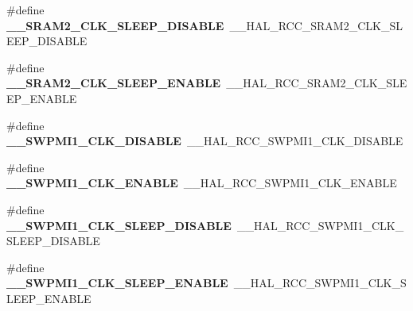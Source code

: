 \begin{DoxyCompactItemize}
\item 
\hypertarget{group___h_a_l___r_c_c___aliased_ga1459281323d5a30163aa6ef88e4dc18e}{\#define {\bfseries \-\_\-\-\_\-\-S\-R\-A\-M2\-\_\-\-C\-L\-K\-\_\-\-S\-L\-E\-E\-P\-\_\-\-D\-I\-S\-A\-B\-L\-E}~\-\_\-\-\_\-\-H\-A\-L\-\_\-\-R\-C\-C\-\_\-\-S\-R\-A\-M2\-\_\-\-C\-L\-K\-\_\-\-S\-L\-E\-E\-P\-\_\-\-D\-I\-S\-A\-B\-L\-E}\label{group___h_a_l___r_c_c___aliased_ga1459281323d5a30163aa6ef88e4dc18e}

\item 
\hypertarget{group___h_a_l___r_c_c___aliased_ga10a4a62a0e9b308c8b7fdd45951efc71}{\#define {\bfseries \-\_\-\-\_\-\-S\-R\-A\-M2\-\_\-\-C\-L\-K\-\_\-\-S\-L\-E\-E\-P\-\_\-\-E\-N\-A\-B\-L\-E}~\-\_\-\-\_\-\-H\-A\-L\-\_\-\-R\-C\-C\-\_\-\-S\-R\-A\-M2\-\_\-\-C\-L\-K\-\_\-\-S\-L\-E\-E\-P\-\_\-\-E\-N\-A\-B\-L\-E}\label{group___h_a_l___r_c_c___aliased_ga10a4a62a0e9b308c8b7fdd45951efc71}

\item 
\hypertarget{group___h_a_l___r_c_c___aliased_gada7c5432ad22e6214be6c30fdbac9638}{\#define {\bfseries \-\_\-\-\_\-\-S\-W\-P\-M\-I1\-\_\-\-C\-L\-K\-\_\-\-D\-I\-S\-A\-B\-L\-E}~\-\_\-\-\_\-\-H\-A\-L\-\_\-\-R\-C\-C\-\_\-\-S\-W\-P\-M\-I1\-\_\-\-C\-L\-K\-\_\-\-D\-I\-S\-A\-B\-L\-E}\label{group___h_a_l___r_c_c___aliased_gada7c5432ad22e6214be6c30fdbac9638}

\item 
\hypertarget{group___h_a_l___r_c_c___aliased_ga6ebd99e0c438717ba9d0f4c33dfee5c7}{\#define {\bfseries \-\_\-\-\_\-\-S\-W\-P\-M\-I1\-\_\-\-C\-L\-K\-\_\-\-E\-N\-A\-B\-L\-E}~\-\_\-\-\_\-\-H\-A\-L\-\_\-\-R\-C\-C\-\_\-\-S\-W\-P\-M\-I1\-\_\-\-C\-L\-K\-\_\-\-E\-N\-A\-B\-L\-E}\label{group___h_a_l___r_c_c___aliased_ga6ebd99e0c438717ba9d0f4c33dfee5c7}

\item 
\hypertarget{group___h_a_l___r_c_c___aliased_gae4421172c1cea5e53893e6f3f41729bf}{\#define {\bfseries \-\_\-\-\_\-\-S\-W\-P\-M\-I1\-\_\-\-C\-L\-K\-\_\-\-S\-L\-E\-E\-P\-\_\-\-D\-I\-S\-A\-B\-L\-E}~\-\_\-\-\_\-\-H\-A\-L\-\_\-\-R\-C\-C\-\_\-\-S\-W\-P\-M\-I1\-\_\-\-C\-L\-K\-\_\-\-S\-L\-E\-E\-P\-\_\-\-D\-I\-S\-A\-B\-L\-E}\label{group___h_a_l___r_c_c___aliased_gae4421172c1cea5e53893e6f3f41729bf}

\item 
\hypertarget{group___h_a_l___r_c_c___aliased_ga9b6dd1efff55cda34909be38a9435f08}{\#define {\bfseries \-\_\-\-\_\-\-S\-W\-P\-M\-I1\-\_\-\-C\-L\-K\-\_\-\-S\-L\-E\-E\-P\-\_\-\-E\-N\-A\-B\-L\-E}~\-\_\-\-\_\-\-H\-A\-L\-\_\-\-R\-C\-C\-\_\-\-S\-W\-P\-M\-I1\-\_\-\-C\-L\-K\-\_\-\-S\-L\-E\-E\-P\-\_\-\-E\-N\-A\-B\-L\-E}\label{group___h_a_l___r_c_c___aliased_ga9b6dd1efff55cda34909be38a9435f08}


\end{DoxyCompactItemize}
